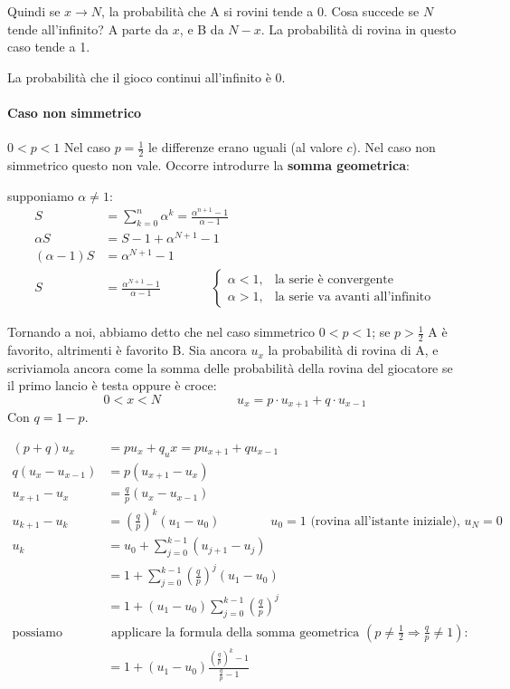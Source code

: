 \documentclass[a4paper,12pt]{book}
\newcommand\ddfrac[2]{\frac{\displaystyle #1}{\displaystyle #2}}
\begin{document}
Quindi se $ x \to N $, la probabilità che A si rovini tende a 0. Cosa succede se $ N $ tende all'infinito? A parte da $ x $, e B da $ N - x $. La probabilità di rovina in questo caso tende a 1. 

La probabilità che il gioco continui all'infinito è 0.

\paragraph{Caso non simmetrico} $ 0 < p < 1 $
Nel caso $ p = \ddfrac{1}{2} $ le differenze erano uguali (al valore $ c $). Nel caso non simmetrico questo non vale. Occorre introdurre la \textbf{somma geometrica}:

supponiamo $ \alpha \ne 1 $:
\begin{align*}
	S & = \sum_{k=0}^n \alpha^k = \ddfrac{\alpha^{n+1} - 1}{\alpha - 1} \\
	\alpha S & = S - 1 + \alpha^{N+1} - 1 \\
	(\alpha - 1)S & = \alpha^{N+1} - 1 \\
	S & = \ddfrac{\alpha^{N+1} - 1}{\alpha - 1} \qquad \qquad \begin{cases}
		\alpha < 1, & \text{la serie è convergente} \\
		\alpha > 1, & \text{la serie va avanti all'infinito}
	\end{cases}
\end{align*}

Tornando a noi, abbiamo detto che nel caso simmetrico $ 0 < p < 1 $; se $ p > \ddfrac{1}{2} $ A è favorito, altrimenti è favorito B. Sia ancora $ u_x $ la probabilità di rovina di A, e scriviamola ancora come la somma delle probabilità della rovina del giocatore se il primo lancio è testa oppure è croce:
$$ 0 < x < N \qquad \qquad \qquad u_x = p\cdot u_{x+1} + q\cdot u_{x-1} $$
Con $ q = 1-p $. 

\begin{align*}
	(p+q)u_x & = pu_x + q_ux = pu_{x+1} + qu_{x-1} \\
	q(u_x - u_{x-1})  & = p(u_{x+1} - u_x) \\
	u_{x+1} - u_x & = \frac{q}{p}(u_x - u_{x-1}) \\
	u_{k+1} - u_k & = (\frac{q}{p})^k(u_1 - u_0) \qquad \qquad u_0 = 1 \text{ (rovina all'istante iniziale), } u_N = 0 \\
	u_k & = u_0 + \sum_{j=0}^{k-1}(u_{j+1} - u_j) \\
	& = 1 + \sum_{j=0}^{k-1}(\frac{q}{p})^j(u_1 - u_0) \\
	& = 1 + (u_1 - u_0) \sum_{j=0}^{k-1} (\frac{q}{p})^j \\
	\text{possiamo} & \text{ applicare la formula della somma geometrica } (p\ne \frac{1}{2} \Rightarrow \frac{q}{p} \ne 1): \\	 
	 & = 1 + (u_1 - u_0)\ddfrac{\left(\ddfrac{q}{p}\right)^k - 1}{\ddfrac{q}{p} - 1}
\end{align*}
\end{document}
